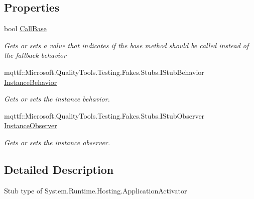 \subsection*{Properties}
\begin{DoxyCompactItemize}
\item 
bool \hyperlink{class_system_1_1_runtime_1_1_hosting_1_1_fakes_1_1_stub_application_activator_a9cba7c4b866d46a57a2fe259ad604754}{Call\-Base}
\begin{DoxyCompactList}\small\item\em Gets or sets a value that indicates if the base method should be called instead of the fallback behavior\end{DoxyCompactList}\item 
mqttf\-::\-Microsoft.\-Quality\-Tools.\-Testing.\-Fakes.\-Stubs.\-I\-Stub\-Behavior \hyperlink{class_system_1_1_runtime_1_1_hosting_1_1_fakes_1_1_stub_application_activator_a509bf7b65e02959cab93c5d4c3a11d31}{Instance\-Behavior}
\begin{DoxyCompactList}\small\item\em Gets or sets the instance behavior.\end{DoxyCompactList}\item 
mqttf\-::\-Microsoft.\-Quality\-Tools.\-Testing.\-Fakes.\-Stubs.\-I\-Stub\-Observer \hyperlink{class_system_1_1_runtime_1_1_hosting_1_1_fakes_1_1_stub_application_activator_a4bfbac99875040de24f1d60513a162d3}{Instance\-Observer}
\begin{DoxyCompactList}\small\item\em Gets or sets the instance observer.\end{DoxyCompactList}\end{DoxyCompactItemize}


\subsection{Detailed Description}
Stub type of System.\-Runtime.\-Hosting.\-Application\-Activator



